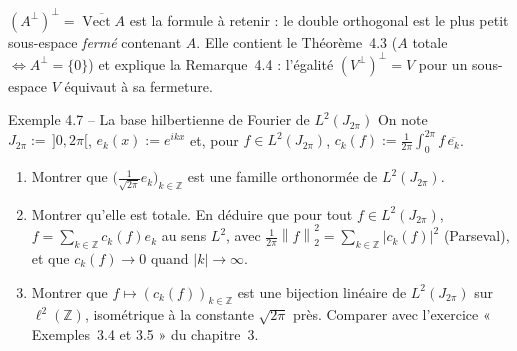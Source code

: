 \documentclass[11pt,a4paper]{article}
\newcommand{\Z}{\mathbb{Z}}
\newcommand{\adh}[1]{\overline{#1}}
\newcommand{\Vect}{\operatorname{Vect}}
\newcommand{\norm}[1]{\left\|#1\right\|}
\theoremstyle{definition}
\begin{document}
\begin{pointcle}
$(A^\perp)^\perp=\adh{\Vect A}$ est la formule à retenir : le double orthogonal est le plus petit sous-espace \emph{fermé} contenant $A$. Elle contient le Théorème~4.3 ($A$ totale $\iff A^\perp=\{0\}$) et explique la Remarque~4.4 : l'égalité $(V^\perp)^\perp=V$ pour un sous-espace $V$ équivaut à sa fermeture.
\end{pointcle}

\begin{exo}{Exemple 4.7 -- La base hilbertienne de Fourier de $L^2(J_{2\pi})$}
On note $J_{2\pi}:=\,]0,2\pi[$, $e_k(x):=e^{ikx}$ et, pour $f\in L^2(J_{2\pi})$, $c_k(f):=\frac1{2\pi}\int_0^{2\pi}f\,\overline{e_k}$.
\begin{enumerate}[label=(\alph*)]
  \item Montrer que $\big(\tfrac1{\sqrt{2\pi}}e_k\big)_{k\in\Z}$ est une famille orthonormée de $L^2(J_{2\pi})$.
  \item Montrer qu'elle est totale. En déduire que pour tout $f\in L^2(J_{2\pi})$, $f=\sum_{k\in\Z}c_k(f)e_k$ au sens $L^2$, avec $\frac1{2\pi}\norm f_2^2=\sum_{k\in\Z}|c_k(f)|^2$ (Parseval), et que $c_k(f)\to0$ quand $|k|\to\infty$.
  \item Montrer que $f\mapsto(c_k(f))_{k\in\Z}$ est une bijection linéaire de $L^2(J_{2\pi})$ sur $\ell^2(\Z)$, isométrique à la constante $\sqrt{2\pi}$ près. Comparer avec l'exercice « Exemples~3.4 et 3.5 » du chapitre~3.
\end{enumerate}
\end{exo}
\end{document}
